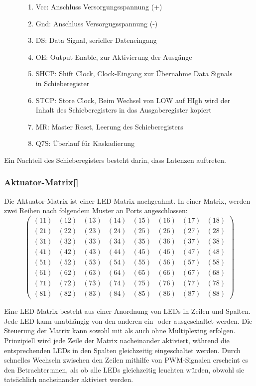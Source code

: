 \begin{figure}[htbp]
\begin{minipage}{0.6\textwidth}
\begin{enumerate}
		\item Vcc: Anschluss Versorgungsspannung (+)
		\item Gnd: Anschluss Versorgugsspannung (-)
		\item DS: Data Signal, serieller Dateneingang
		\item OE: Output Enable, zur Aktivierung der Ausgänge
		\item SHCP: Shift Clock, Clock-Eingang zur Übernahme Data Signals in Schieberegister
		\item STCP: Store Clock, Beim Wechsel von LOW auf HIgh wird der Inhalt des Schieberegisters in das Ausgaberegister kopiert %
		\item MR: Master Reset, Leerung des Schieberegisters
		\item Q7S: Überlauf für Kaskadierung
	\end{enumerate}
\end{minipage}
\end{figure}
Ein Nachteil des Schieberegisters besteht darin, dass Latenzen auftreten.
\subsubsection{Aktuator-Matrix[\cite*[siehe ][]{LEDMatrix}]}
Die Aktuator-Matrix ist einer LED-Matrix nachgeahmt.
In einer Matrix, werden zwei Reihen nach folgendem Muster an Ports angeschlossen:
$$
\begin{pmatrix}
	(11) & (12) & (13) & (14) & (15) & (16) & (17) & (18) \\
	(21) & (22) & (23) & (24) & (25) & (26) & (27) & (28) \\
	(31) & (32) & (33) & (34) & (35) & (36) & (37) & (38) \\
	(41) & (42) & (43) & (44) & (45) & (46) & (47) & (48) \\
	(51) & (52) & (53) & (54) & (55) & (56) & (57) & (58) \\
	(61) & (62) & (63) & (64) & (65) & (66) & (67) & (68) \\
	(71) & (72) & (73) & (74) & (75) & (76) & (77) & (78) \\
	(81) & (82) & (83) & (84) & (85) & (86) & (87) & (88)
\end{pmatrix}
$$

Eine LED-Matrix besteht aus einer Anordnung von LEDs in Zeilen und Spalten.
Jede LED kann unabhängig von den anderen ein- oder ausgeschaltet werden.
Die Steuerung der Matrix kann sowohl mit als auch ohne Multiplexing erfolgen.
Prinzipiell wird jede Zeile der Matrix nacheinander aktiviert, während die
entsprechenden LEDs in den Spalten gleichzeitig eingeschaltet werden.
Durch schnelles Wechseln zwischen den Zeilen mithilfe von \ac{PWM}-Signalen erscheint es den Betrachter:nnen, als ob alle LEDs
gleichzeitig leuchten würden, obwohl sie tatsächlich nacheinander aktiviert werden.

